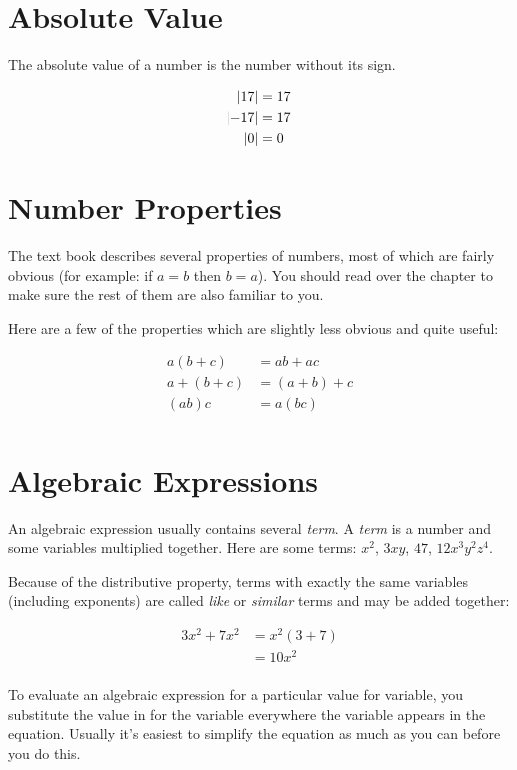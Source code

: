 \documentclass[letterpaper, landscape]{exam}
\begin{document}
  \section{Absolute Value}

  The absolute value of a number is the number without its sign.

  \begin{align*}
    \envert{17}  & = 17 \\
    \envert{-17} & = 17 \\
    \envert{0}   & = 0 \\
  \end{align*}

  \section{Number Properties}

  The text book describes several properties of numbers, most of which are fairly obvious (for
  example: if \( a = b \) then \( b = a \)).  You should read over the chapter to make sure the rest
  of them are also familiar to you.  

  Here are a few of the properties which are slightly less obvious and quite useful:

  \begin{align*}
    a (b + c)   & = ab + ac \\
    a + (b + c) & = (a + b) + c \\
    (ab)c       & = a(bc) \\
  \end{align*}

  \section{Algebraic Expressions}

  An algebraic expression usually contains several {\em term}.  A {\em term} is a number and some
  variables multiplied together.  Here are some terms: \( x^2 \), $ 3xy $,  $ 47 $, $ 12x^3y^2z^4 $.


  Because of the distributive property, terms with exactly the same variables (including exponents)
  are called {\em like} or {\em similar} terms and may be added together:

  \begin{align*}
    3x^2 + 7x^2 & = x^2(3 + 7) \\
                & = 10x^2  \\
  \end{align*}

  To evaluate an algebraic expression for a particular value for variable, you substitute the value
  in for the variable everywhere the variable appears in the equation.  Usually it's easiest to
  simplify the equation as much as you can before you do this.
\end{document}
